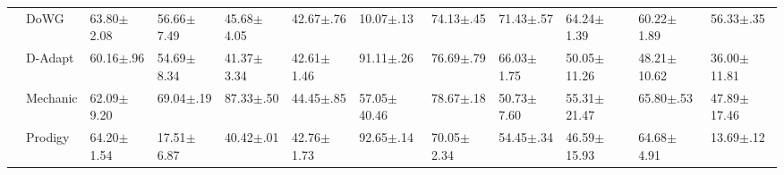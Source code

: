 \documentclass{article} %
\begin{document}
\begin{center}
\begin{sideways}
\begin{minipage}{0.9\textheight}
\begin{tabular}{llllllllllll}
                                                               & DoWG      & 63.80$\pm$2.08             & 56.66$\pm$7.49            & 45.68$\pm$4.05             & 42.67$\pm$.76              & 10.07$\pm$.13           & 74.13$\pm$.45             & 71.43$\pm$.57           & 64.24$\pm$1.39           & 60.22$\pm$1.89           & 56.33$\pm$.35            \\
                                                               & D-Adapt   & 60.16$\pm$.96              & 54.69$\pm$8.34            & 41.37$\pm$3.34             & 42.61$\pm$1.46             & 91.11$\pm$.26           & 76.69$\pm$.79             & 66.03$\pm$1.75          & 50.05$\pm$11.26          & 48.21$\pm$10.62          & 36.00$\pm$11.81          \\
                                                               & Mechanic  & 62.09$\pm$9.20             & 69.04$\pm$.19             & 87.33$\pm$.50              & 44.45$\pm$.85              & 57.05$\pm$40.46         & 78.67$\pm$.18             & 50.73$\pm$7.60          & 55.31$\pm$21.47          & 65.80$\pm$.53            & 47.89$\pm$17.46          \\
                                                               & Prodigy   & 64.20$\pm$1.54             & 17.51$\pm$6.87            & 40.42$\pm$.01              & 42.76$\pm$1.73             & 92.65$\pm$.14           & 70.05$\pm$2.34            & 54.45$\pm$.34           & 46.59$\pm$15.93          & 64.68$\pm$4.91           & 13.69$\pm$.12            \\
            \bottomrule
         \end{tabular}
      \end{minipage}
   \end{sideways}
\end{center}
\end{document}
